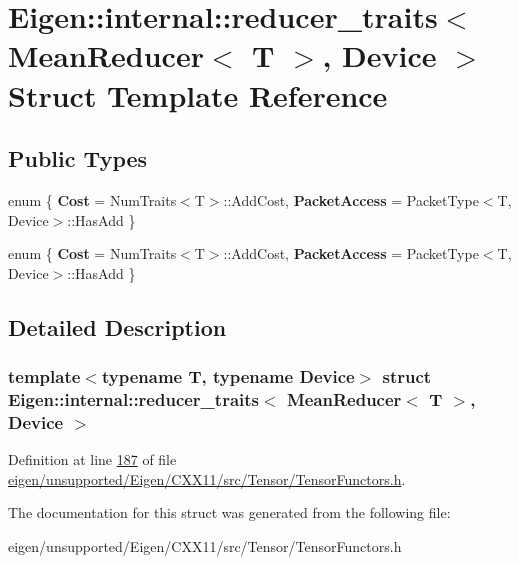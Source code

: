 \hypertarget{struct_eigen_1_1internal_1_1reducer__traits_3_01_mean_reducer_3_01_t_01_4_00_01_device_01_4}{}\section{Eigen\+:\+:internal\+:\+:reducer\+\_\+traits$<$ Mean\+Reducer$<$ T $>$, Device $>$ Struct Template Reference}
\label{struct_eigen_1_1internal_1_1reducer__traits_3_01_mean_reducer_3_01_t_01_4_00_01_device_01_4}
\subsection*{Public Types}
\begin{DoxyCompactItemize}
\item 
\mbox{\label{struct_eigen_1_1internal_1_1reducer__traits_3_01_mean_reducer_3_01_t_01_4_00_01_device_01_4_a3b453306324fda85860fed92d9b9a29a}} 
enum \{ {\bfseries Cost} = Num\+Traits$<$T$>$\+:\+:Add\+Cost, 
{\bfseries Packet\+Access} = Packet\+Type$<$T, Device$>$\+:\+:Has\+Add
 \}
\item 
\mbox{\label{struct_eigen_1_1internal_1_1reducer__traits_3_01_mean_reducer_3_01_t_01_4_00_01_device_01_4_af2170e69b509ad7e446a77296796fff6}} 
enum \{ {\bfseries Cost} = Num\+Traits$<$T$>$\+:\+:Add\+Cost, 
{\bfseries Packet\+Access} = Packet\+Type$<$T, Device$>$\+:\+:Has\+Add
 \}
\end{DoxyCompactItemize}


\subsection{Detailed Description}
\subsubsection*{template$<$typename T, typename Device$>$\newline
struct Eigen\+::internal\+::reducer\+\_\+traits$<$ Mean\+Reducer$<$ T $>$, Device $>$}



Definition at line \hyperlink{eigen_2unsupported_2_eigen_2_c_x_x11_2src_2_tensor_2_tensor_functors_8h_source_l00187}{187} of file \hyperlink{eigen_2unsupported_2_eigen_2_c_x_x11_2src_2_tensor_2_tensor_functors_8h_source}{eigen/unsupported/\+Eigen/\+C\+X\+X11/src/\+Tensor/\+Tensor\+Functors.\+h}.



The documentation for this struct was generated from the following file\+:\begin{DoxyCompactItemize}
\item 
eigen/unsupported/\+Eigen/\+C\+X\+X11/src/\+Tensor/\+Tensor\+Functors.\+h\end{DoxyCompactItemize}
